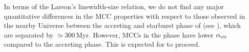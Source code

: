 \IfFileExists{emulateapjlegacy.cls}{\documentclass[iop]{emulateapjlegacy}}{\documentclass[iop]{emulateapj}}
\newcommand{\MM}[1]{({\bf \color{mmcolor} MM: #1})}
\begin{document}
In terms of the Larson's linewidth-size relation, we do not find any major quantitative differences in the MCC properties with respect to those observed in the nearby Universe between the accreting and starburst phase of \flower (see ), which are separated by $\simeq$300\,Myr. However, MCCs in the \SB phase have lower $\alpha_{\rm vir}$ compared to the accreting phase. This is expected for \SF to proceed.

%
%
\end{document}

